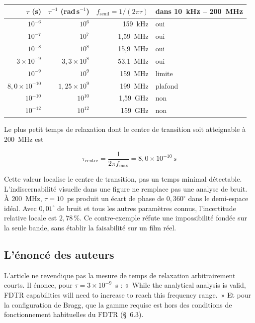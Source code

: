 \documentclass[11pt,a4paper]{article}
\newenvironment{encadre}{\par\smallskip\begin{shaded}\vspace{-6pt}}{\vspace{-6pt}\end{shaded}\par\smallskip}
\begin{document}
\smallskip
{\small\centering
\begin{tabular}{@{}rrrl@{}}
\toprule
$\tau$ (s) & $\tau^{-1}$ (rad\,s$^{-1}$) & $f_{\text{seuil}} = 1/(2\pi\tau)$ &
dans 10~kHz -- 200~MHz \\
\midrule
$10^{-6}$            & $10^{6}$             & 159~kHz   & oui \\
$10^{-7}$            & $10^{7}$             & 1,59~MHz  & oui \\
$10^{-8}$            & $10^{8}$             & 15,9~MHz  & oui \\
$3\times10^{-9}$     & $3{,}3\times10^{8}$  & 53,1~MHz  & oui \\
$10^{-9}$            & $10^{9}$             & 159~MHz   & limite \\
$8{,}0\times10^{-10}$& $1{,}25\times10^{9}$ & 199~MHz   & plafond \\
$10^{-10}$           & $10^{10}$            & 1,59~GHz  & non \\
$10^{-12}$           & $10^{12}$            & 159~GHz   & non \\
\bottomrule
\end{tabular}\par}

\smallskip
Le plus petit temps de relaxation dont le centre de transition soit atteignable à 200~MHz est
\begin{encadre}
\[
\tau_{\mathrm{centre}} = \frac{1}{2\pi f_{\max}} = 8{,}0\times10^{-10}\ \text{s}
\]
\end{encadre}
Cette valeur localise le centre de transition, pas un temps minimal détectable.
L'indiscernabilité visuelle dans une figure ne remplace pas une analyse de bruit.
À 200~MHz, $\tau=10$~ps produit un écart de phase de $0{,}360^\circ$ dans le
demi-espace idéal. Avec $0{,}01^\circ$ de bruit et tous les autres paramètres connus,
l'incertitude relative locale est $2{,}78\,\%$. Ce contre-exemple réfute une
impossibilité fondée sur la seule bande, sans établir la faisabilité sur un film réel.

\subsection{L'énoncé des auteurs}

L'article ne revendique pas la mesure de temps de relaxation arbitrairement courts. Il énonce,
pour $\tau = 3\times10^{-9}$~s : «~While the analytical analysis is valid, FDTR capabilities will
need to increase to reach this frequency range.~» Et pour la configuration de Bragg, que la
gamme requise est hors des conditions de fonctionnement habituelles du FDTR (§~6.3).
\end{document}
